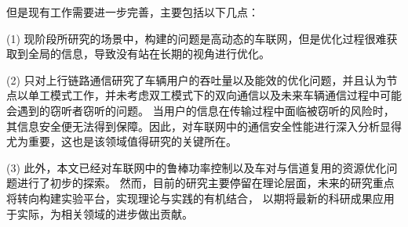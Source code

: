 \begin{conclusion}
但是现有工作需要进一步完善，主要包括以下几点：

(1) 现阶段所研究的场景中，构建的问题是高动态的车联网，但是优化过程很难获取到全局的信息，导致没有站在长期的视角进行优化。

(2) 只对上行链路通信研究了车辆用户的吞吐量以及能效的优化问题，并且认为节点以单工模式工作，并未考虑双工模式下的双向通信以及未来车辆通信过程中可能会遇到的窃听者窃听的问题。
当用户的信息在传输过程中面临被窃听的风险时，其信息安全便无法得到保障。因此，对车联网中的通信安全性能进行深入分析显得尤为重要，这也是该领域值得研究的关键所在。

(3) 此外，本文已经对车联网中的鲁棒功率控制以及车对与信道复用的资源优化问题进行了初步的探索。
然而，目前的研究主要停留在理论层面，未来的研究重点将转向构建实验平台，实现理论与实践的有机结合，
以期将最新的科研成果应用于实际，为相关领域的进步做出贡献。
\begin{comment}
结论应是作者在学位论文研究过程中所取得的创新性成果的概要总结，不能与摘要混为一谈。结论应包括论文的主要结果、创新点、展望三部分，在结论中应概括论文的核心观点，明确、客观地指出本研究内容的创新性成果（含新见解、新观点、方法创新、技术创新、理论创新），并指出今后进一步在本研究方向进行研究工作的展望与设想。对所取得的创新性成果应注意从定性和定量两方面给出科学、准确的评价，分(1)、(2)、(3)…条列出，宜用“提出了”、“建立了”等词叙述。此外，结论的撰写还应符合以下基本要求：

(1) 结论具有相对的独立性，不应是对论文中各章小结的简单重复。结论要与引言相呼应，以自身的条理性、明确性、客观性反映论文价值。对论文创新内容的概括，评价要适当。
(2) 结论措辞要准确、严谨，不能模棱两可，避免使用“大概”、“或许”、“可能是”等词语。结论中不应有解释性词语，而应直接给出结果。结论中一般不使用量的符号，而宜用量的名称。

(3) 结论应指出论文研究工作的局限性或遗留问题，如条件所限，或存在例外情况，或本论文尚难以解释或解决的问题。

(4) 常识性的结果或重复他人的结果不应作为结论。

技术难点：
(1)在各复现室外测试场景条件下对设计的分布式可靠传输策略、动态功率优化算法、以及鲁棒博弈策略是否适合于真是的物理环境。
(2)如何将制定的优化问题通过一定数学处理使得问题易于求解是个难点，以及如何得到有效的功率迭代算法是关键的问题。
(3)在进行仿真验证时，相关参数的选取会对结果产生重要影响，如何快速准确的设置相关的参数是仿真中面临的一个关键问题。。
创新点：
(1)考虑了车联网场景中由车辆高速移动所引起的信道不确定性，引入一阶马尔可夫过程。构建了合理可行的车联网络场景，使之在描述车联网动态特性的情况下，又能够通过相应的约束条件和目标函数保证网络通信服务质量。
(2)改进并推广了贝恩斯坦近似方法，将其运用于中断概率的矩阵形式中以处理大规模动态车辆网络环境下非凸的信干噪比约束。
(3)联合考虑了高动态车联网环境下的云边协同计算资源分配与功率优化，使得系统容量最大化的同时以最优卸载策略使车辆中的计算资源得到充分利用。

\end{comment}
\end{conclusion}
